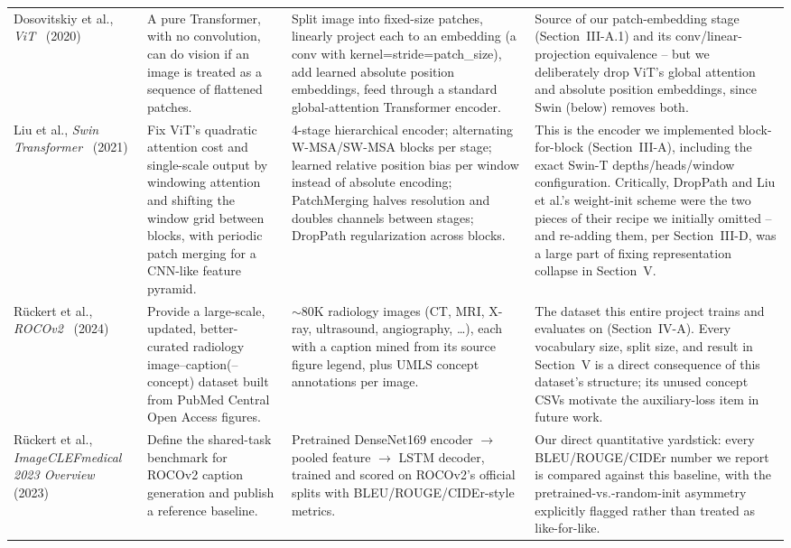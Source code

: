 \documentclass[conference]{IEEEtran}
\begin{document}
\begin{table}[t]
\begin{tabularx}{\textwidth}{@{}p{2.3cm}X X X@{}}
Dosovitskiy et al., \emph{ViT}~\cite{dosovitskiy2020vit} (2020)
&
A pure Transformer, with no convolution, can do vision if an image is treated as a sequence of flattened patches.
&
Split image into fixed-size patches, linearly project each to an embedding (a conv with kernel=stride=patch\_size), add learned absolute position embeddings, feed through a standard global-attention Transformer encoder.
&
Source of our patch-embedding stage (Section~III-A.1) and its conv/linear-projection equivalence -- but we deliberately drop ViT's global attention and absolute position embeddings, since Swin (below) removes both. \\

Liu et al., \emph{Swin Transformer}~\cite{liu2021swin} (2021)
&
Fix ViT's quadratic attention cost and single-scale output by windowing attention and shifting the window grid between blocks, with periodic patch merging for a CNN-like feature pyramid.
&
4-stage hierarchical encoder; alternating W-MSA/SW-MSA blocks per stage; learned relative position bias per window instead of absolute encoding; PatchMerging halves resolution and doubles channels between stages; DropPath regularization across blocks.
&
This is the encoder we implemented block-for-block (Section~III-A), including the exact Swin-T depths/heads/window configuration. Critically, DropPath and Liu et al.'s weight-init scheme were the two pieces of their recipe we initially omitted -- and re-adding them, per Section~III-D, was a large part of fixing representation collapse in Section~V. \\

Rückert et al., \emph{ROCOv2}~\cite{ruckert2024rocov2} (2024)
&
Provide a large-scale, updated, better-curated radiology image--caption(--concept) dataset built from PubMed Central Open Access figures.
&
$\sim$80K radiology images (CT, MRI, X-ray, ultrasound, angiography, \ldots), each with a caption mined from its source figure legend, plus UMLS concept annotations per image.
&
The dataset this entire project trains and evaluates on (Section~IV-A). Every vocabulary size, split size, and result in Section~V is a direct consequence of this dataset's structure; its unused concept CSVs motivate the auxiliary-loss item in future work. \\

Rückert et al., \emph{ImageCLEFmedical 2023 Overview}~\cite{ruckert2023imageclef} (2023)
&
Define the shared-task benchmark for ROCOv2 caption generation and publish a reference baseline.
&
Pretrained DenseNet169 encoder $\to$ pooled feature $\to$ LSTM decoder, trained and scored on ROCOv2's official splits with BLEU/ROUGE/CIDEr-style metrics.
&
Our direct quantitative yardstick: every BLEU/ROUGE/CIDEr number we report is compared against this baseline, with the pretrained-vs.-random-init asymmetry explicitly flagged rather than treated as like-for-like. \\


\end{tabularx}
\end{table}
\end{document}
